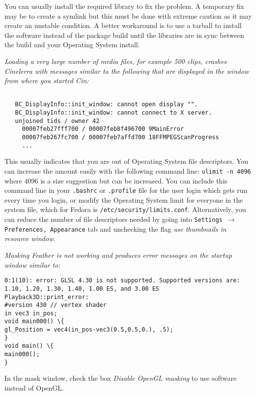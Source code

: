 You can usually install the required library to fix the problem. A temporary fix may be to create a symlink but this must be done with extreme caution as it may create an unstable condition. A better workaround is to use a tarball to install the software instead of the package build until the libraries are in sync between the build and your Operating System install.
\bigskip

\textit{ Loading a very large number of media files, for example 500 clips, crashes Cinelerra with messages similar to the following that are displayed in the window from where you started Cin:}

\begin{lstlisting}[numbers=none,xleftmargin=10mm]

   BC_DisplayInfo::init_window: cannot open display "".
   BC_DisplayInfo::init_window: cannot connect to X server.
   unjoined tids / owner 42
     00007feb27fff700 / 00007feb8f496700 9MainError
     00007feb267fc700 / 00007feb7affd700 18FFMPEGScanProgress
     ... 

\end{lstlisting}

This usually indicates that you are out of Operating System file descriptors.  You can increase the amount easily with the following command line:  \texttt{ulimit -n 4096}   where 4096 is a size suggestion but can be increased.  You can include this command line in your \texttt{.bashrc} or \texttt{.profile} file for the user login which gets run every time you login, or modify the Operating System limit for everyone in the system file, which for Fedora is \texttt{/etc/security/limits.conf}.  Alternatively, you can reduce the number of file descriptors needed by going into \texttt{Settings $\rightarrow$ Preferences, Appearance} tab and unchecking the flag \textit{use thumbnails in resource window}.

\bigskip
\textit{Masking Feather is not working and produces error messages on the startup window similar to:}

\begin{lstlisting}[numbers=none,xleftmargin=10mm]
0:1(10): error: GLSL 4.30 is not supported. Supported versions are: 1.10, 1.20, 1.30, 1.40, 1.00 ES, and 3.00 ES
Playback3D::print_error:
#version 430 // vertex shader
in vec3 in_pos;
void main000() \{
gl_Position = vec4(in_pos-vec3(0.5,0.5,0.), .5);
}
void main() \{
main000();
}
\end{lstlisting}

In the mask window, check the box \textit{Disable OpenGL masking} to use software instead of OpenGL.

